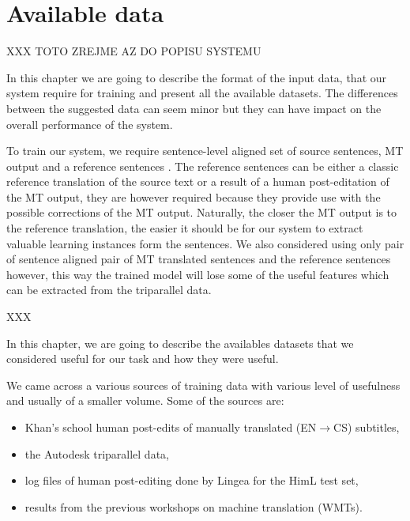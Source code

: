 \chapter{Available data}


XXX TOTO ZREJME AZ DO POPISU SYSTEMU

In this chapter we are going to describe the format of the input data, that
our system require for training and present all the available datasets.
The differences between the suggested data can seem minor but they can
have impact on the overall performance of the system.

To train our system, we require sentence-level aligned set of source sentences,
MT output and a reference sentences
. The reference sentences can be either
a classic reference translation of the source text or a result of a human
post-editation of the MT output, they are however required because they
provide use with the possible corrections of the MT output.
Naturally, the closer the MT output is
to the reference translation, the easier it should be for our system
to extract valuable learning instances form the sentences. We also
considered using only pair of sentence aligned pair of MT translated
sentences and the reference sentences however, this way the trained
model will lose some of the useful features which can be extracted from
the triparallel data.

XXX

In this chapter, we are going to describe the availables datasets that
we considered useful for our task and how they were useful.

We came across a various sources of training data with various level
of usefulness and usually of a smaller volume. Some of the sources
are:
\begin{itemize}
\item Khan's school human
post-edits of manually translated (EN$\rightarrow$CS) subtitles,
\item the Autodesk
triparallel data,
\item log files of human post-editing done by Lingea for the
HimL test set,


\item results from the previous workshops on machine translation (WMTs).
\end{itemize}

